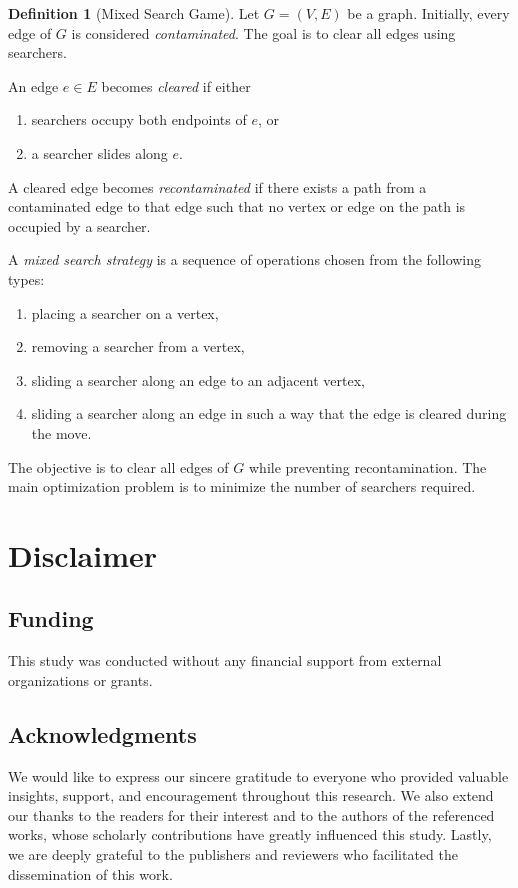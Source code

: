 \documentclass[10pt]{book}
\theoremstyle{definition}
\newtheorem{definition}[theorem]{Definition}
\begin{document}
\begin{definition}[Mixed Search Game]
Let \(G=(V,E)\) be a graph.  
Initially, every edge of \(G\) is considered \emph{contaminated}.  
The goal is to clear all edges using searchers.

An edge \(e\in E\) becomes \emph{cleared} if either
\begin{enumerate}
    \item searchers occupy both endpoints of \(e\), or
    \item a searcher slides along \(e\).
\end{enumerate}

A cleared edge becomes \emph{recontaminated} if there exists a path from a contaminated edge to that edge such that no vertex or edge on the path is occupied by a searcher.

A \emph{mixed search strategy} is a sequence of operations chosen from the following types:
\begin{enumerate}
    \item placing a searcher on a vertex,
    \item removing a searcher from a vertex,
    \item sliding a searcher along an edge to an adjacent vertex,
    \item sliding a searcher along an edge in such a way that the edge is cleared during the move.
\end{enumerate}

The objective is to clear all edges of \(G\) while preventing recontamination.  
The main optimization problem is to minimize the number of searchers required.
\end{definition}

\newpage

\chapter*{Disclaimer}
\section*{Funding}
This study was conducted without any financial support from external organizations or grants.

\section*{Acknowledgments}
We would like to express our sincere gratitude to everyone who provided valuable insights, support, and encouragement throughout this research. We also extend our thanks to the readers for their interest and to the authors of the referenced works, whose scholarly contributions have greatly influenced this study. Lastly, we are deeply grateful to the publishers and reviewers who facilitated the dissemination of this work.
\end{document}
